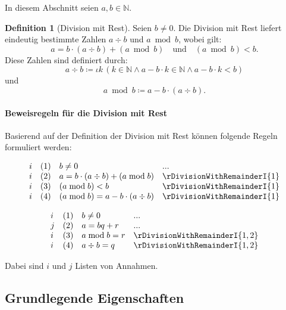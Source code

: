 \documentclass{book}
\theoremstyle{plain}
\theoremstyle{remark}
\theoremstyle{definition}
\newtheorem{definition}{Definition}[section]
\begin{document}
In diesem Abschnitt seien \( a, b \in \mathbb{N} \).

\begin{definition}[Division mit Rest]
Seien \( b \neq 0 \). Die Division mit Rest liefert eindeutig bestimmte Zahlen \( a \div b \) und \( a \bmod b \), wobei gilt:
\[
a = b \cdot (a \div b) + (a \bmod b) \quad \text{und} \quad (a \bmod b) < b.
\]
Diese Zahlen sind definiert durch:
\[
a \div b \coloneqq \iota k \, (k \in \mathbb{N} \land a - b \cdot k \in \mathbb{N} \land a - b \cdot k < b)
\]
und
\[
a \bmod b \coloneqq a - b \cdot (a \div b).
\]
\end{definition}

\paragraph{Beweisregeln für die Division mit Rest}
\label{rule:rDivisionWithRemainderI} 

Basierend auf der Definition der Division mit Rest können folgende Regeln formuliert werden:

\[
\begin{array}{llll}
    i & (1) & b \neq 0 & ... \\
    i & (2) & a = b \cdot (a \div b) + (a \bmod b)  & \rDivisionWithRemainderI{1} \\
    i & (3) & (a \bmod b) < b & \rDivisionWithRemainderI{1} \\
    i & (4) & (a \bmod b)=a-b \cdot (a \div b) & \rDivisionWithRemainderI{1} \\
\end{array}
\]

\[
\begin{array}{llll}
    i & (1) & b \neq 0 & ... \\
    j & (2) & a = bq + r  & ... \\
    i & (3) & a \bmod b = r & \rDivisionWithRemainderI{1,2} \\
    i & (4) & a \div b=q & \rDivisionWithRemainderI{1,2} \\
\end{array}
\]

Dabei sind \( i \) und \( j \) Listen von Annahmen.


\subsection{Grundlegende Eigenschaften}
\end{document}
